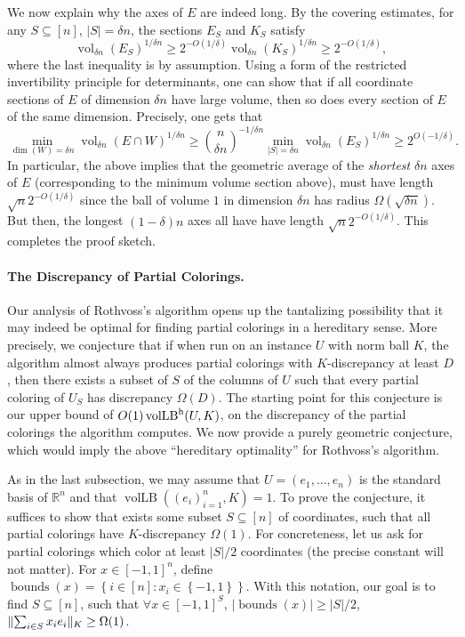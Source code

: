 \documentclass[11pt]{article}
\newcommand{\R}{{\mathbb{R}}}
\newcommand{\set}[1]{\left\{ #1 \right\}}
\DeclareMathOperator{\vollb}{volLB}
\DeclareMathOperator{\vol}{vol}
\DeclareMathOperator{\bnds}{bounds}
\DeclarePairedDelimiter\norm{\lVert}{\rVert}
\begin{document}
We now explain why the axes of $E$ are indeed long. By the covering estimates,
for any $S \subseteq [n]$, $|S| = \delta n$, the sections $E_S$ and $K_S$ satisfy
\[
\vol_{\delta n}(E_S)^{1/{\delta n}} \geq 2^{-O(1/\delta)} \vol_{\delta
n}(K_S)^{1/{\delta n}} \geq 2^{-O(1/\delta)},
\]
where the last inequality is by assumption. Using a form of the
restricted invertibility principle for determinants, one can show that if all
coordinate sections of $E$ of dimension $\delta n$ have large volume, then so
does every section of $E$ of the same dimension.  Precisely, one gets that 
\[
\min_{\dim(W)=\delta n} \vol_{\delta n}(E \cap W)^{1/\delta n} \geq \binom{n}{\delta
n}^{-1/\delta n} \min_{|S|=\delta n} \vol_{\delta n}(E_S)^{1/\delta n} \geq
2^{O(-1/\delta)}.
\]
In particular, the above implies that the geometric average of the
\emph{shortest} $\delta n$ axes of $E$ (corresponding to the minimum volume
section above), must have length $\sqrt{n}2^{-O(1/\delta)}$ since the ball of
volume $1$ in dimension $\delta n$ has radius $\Omega(\sqrt{\delta n})$. But
then, the longest $(1-\delta) n$ axes all have have length
$\sqrt{n}2^{-O(1/\delta)}$. This completes the proof sketch.  

\paragraph{\bf The Discrepancy of Partial Colorings.} Our analysis of Rothvoss's
algorithm opens up the tantalizing possibility that it may indeed be optimal for
finding partial colorings in a hereditary sense. More precisely, we conjecture
that if when run on an instance $U$ with norm ball $K$, the algorithm almost
always produces partial colorings with $K$-discrepancy at least $D$, then there
exists a subset of $S$ of the columns of $U$ such that every partial coloring
of $U_S$ has discrepancy $\Omega(D)$. The starting point for this conjecture is
our upper bound of $O(1) \vollb^{\rm h}(U,K)$, on the discrepancy of the partial
colorings the algorithm computes. We now provide a purely geometric conjecture,
which would imply the above ``hereditary optimality'' for Rothvoss's algorithm. 

As in the last subsection, we may assume that $U=(e_1,\dots,e_n)$ is the
standard basis of $\R^n$ and that $\vollb((e_i)_{i=1}^n,K) = 1$. To prove the
conjecture, it suffices to show that exists some subset $S \subseteq [n]$ of
coordinates, such that all partial colorings have $K$-discrepancy $\Omega(1)$.
For concreteness, let us ask for partial colorings which color at least $|S|/2$
coordinates (the precise constant will not matter). For $x \in [-1,1]^n$, define
$\bnds(x) = \set{i \in [n]: x_i \in \set{-1,1}}$.  With this notation, our goal
is to find $S \subseteq [n]$, such that $\forall x \in [-1,1]^S$, $|\bnds(x)|
\geq |S|/2$, $\norm{\sum_{i \in S} x_i e_i}_K \geq \Omega(1)$.
\end{document}
